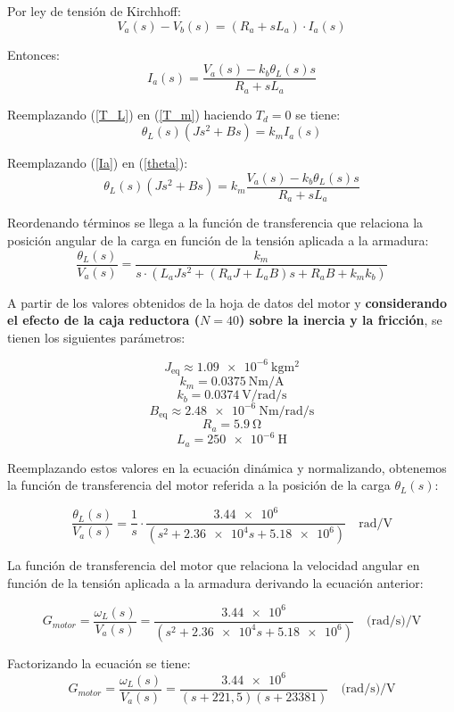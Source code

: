 Por ley de tensión de Kirchhoff:
\[
V_a(s) - V_b(s) = (R_a + sL_a) \cdot I_a(s)
\]

Entonces:
\begin{equation}
	I_a(s) = \frac{V_a(s) - k_b \theta_L(s) s}{R_a + s L_a} \label{Ia}
\end{equation}

Reemplazando (\ref{T_L}) en (\ref{T_m}) haciendo $T_d = 0$ se tiene:
\begin{equation}
	\theta_L(s)(J s^2 + B s) = k_m I_a(s) \label{theta}
\end{equation}

Reemplazando (\ref{Ia}) en (\ref{theta}):
\[
\theta_L(s)(J s^2 + B s) = k_m \frac{V_a(s) - k_b \theta_L(s) s}{R_a + s L_a}
\]


Reordenando términos se llega a la función de transferencia que relaciona la posición angular de la carga en función de la tensión aplicada a la armadura:
\[
\frac{\theta_L(s)}{V_a(s)} = \frac{k_m}{s \cdot \left( L_a J s^2 + (R_a J + L_a B) s + R_a B + k_m k_b \right)}
\]

A partir de los valores obtenidos de la hoja de datos del motor y \textbf{considerando el efecto de la caja reductora ($N=40$) sobre la inercia y la fricción}, se tienen los siguientes parámetros:

\[
J_{\text{eq}} \approx \SI{1,09e-6}{\kilogram\meter\squared}
\]
\[
k_m = \SI{0,0375}{\newton\meter\per\ampere}
\]
\[
k_b = \SI{0,0374}{\volt\per\radian\per\second}
\]
\[
B_{\text{eq}} \approx \SI{2,48e-6}{\newton\meter\per\radian\per\second}
\]
\[
R_a = \SI{5,9}{\ohm}
\]
\[
L_a = \SI{250e-6}{\henry}
\]

Reemplazando estos valores en la ecuación dinámica y normalizando, obtenemos la función de transferencia del motor referida a la posición de la carga $\theta_L(s)$:

\[
\frac{\theta_L(s)}{V_a(s)} = \frac{1}{s} \cdot \frac{\num{3,44e6}}{ (s^2 + \num{2,36e4}s + \num{5,18e6})} \quad \unit{\radian\per\volt}
\]

La función de transferencia del motor que relaciona la velocidad angular en función de la tensión aplicada a la armadura derivando la ecuación anterior:

\begin{equation}
	G_{motor} = \frac{\omega_L(s)}{V_a(s)} =  \frac{\num{3,44e6}}{ (s^2 + \num{2,36e4}s + \num{5,18e6})} \quad \unit{(\radian\per\second)\per\volt} 
\end{equation}

Factorizando la ecuación se tiene:
\begin{equation}
	G_{motor} = \frac{\omega_L(s)}{V_a(s)} =  \frac{\num{3,44e6}}{ (s + 221,5)(s + 23381)} \quad \unit{(\radian\per\second)\per\volt} \label{eq:fdt_motor}
\end{equation}

